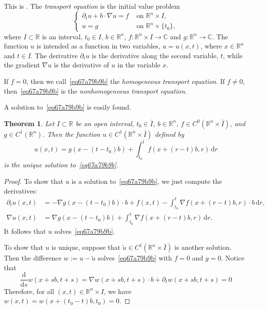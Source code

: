 \documentclass[a4paper,9pt]{amsart}
\newcommand{\R}{\mathbb{R}}	%
\newcommand{\C}{\mathbb{C}}	%
\newcommand{\dd}{\mathrm{d}}	%
\newcommand{\did}{\,\mathrm{d}}	%
\newcommand{\de}{\partial}		%
\newcommand{\grad}{\nabla}
\theoremstyle{plain}
\newtheorem{theorem}[proposition]{Theorem}
\theoremstyle{definition}
\theoremstyle{remark}
\begin{document}
This is \cite[Section 2.1]{MR2597943}.
The \emph{transport equation} is the initial value problem
\begin{equation}\label{eq67a79b9b}
	\begin{cases}
	\de_t u + b\cdot \grad u = f & \text{ on }\R^n\times I , \\
	u = g & \text{ on }\R^n\times\{t_0\} ,
	\end{cases}
\end{equation}
where $I\subset\R$ is an interval, $t_0\in I$, $b\in\R^n$, $f:\R^n\times I\to\C$ and $g:\R^n\to\C$.
The function $u$ is intended as a function in two variables, $u=u(x,t)$, where $x\in\R^n$ and $t\in I$.
The derivative $\de_tu$ is the derivative along the second variable, $t$, 
while the gradient $\grad u$ is the derivative of $u$ in the variable $x$.

If $f=0$, then we call~\eqref{eq67a79b9b} the \emph{homogeneous transport equation}.
If $f\neq0$, then~\eqref{eq67a79b9b} is the \emph{nonhomogeneous transport equation}.

A solution to~\eqref{eq67a79b9b} is easily found.

\begin{theorem}\label{thm67d7b17c}
	Let $I\subset \R$ be an open interval, $t_0\in \bar I$, $b\in\R^n$, $f\in C^0(\R^n\times \bar I)$, and $g\in C^1(\R^n)$.
	Then the function $u\in C^1(\R^n\times \bar I)$ defined by
	\begin{equation}\label{eq67a79d37}
		u(x,t) = g(x-(t-t_0)b) + \int_{t_0}^t f(x+(r-t)b,r) \did r
	\end{equation}
	is the unique solution to~\eqref{eq67a79b9b}.
\end{theorem}
\begin{proof}
	To show that $u$ is a solution to~\eqref{eq67a79b9b}, we just compute the derivatives:
	\begin{align*}
	\de_t u(x,t) &= - \grad g(x-(t-t_0)b)\cdot b + f(x,t) - \int_{t_0}^t \grad f(x+(r-t)b,r)\cdot b \did r ,\\
	\grad u(x,t) &= \grad g(x-(t-t_0)b) + \int_{t_0}^t \grad f(x+(r-t)b,r) \did r .
	\end{align*}
	It follows that $u$ solves~\eqref{eq67a79b9b}.
	
	To show that $u$ is unique, suppose that $\tilde u\in C^1(\R^n\times \bar I)$ is another solution.
	Then the difference $w := u-\tilde u$ solves~\eqref{eq67a79b9b} with $f=0$ and $g=0$. 
	Notice that 
	\[
	\frac{\dd}{\dd s} w(x+ sb,t+s) = \grad w(x+sb,t+s)\cdot b + \de_t w(x+sb,t+s) = 0
	\]
	Therefore, for all $(x,t)\in \R^n\times I$, we have $w(x,t) = w(x+(t_0-t)b,t_0) = 0$.
\end{proof}
\end{document}
